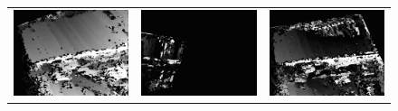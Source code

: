 \documentclass[11pt]{report}
\begin{document}
\begin{figure}[H]
\begin{tabular}{ccc}
    \includegraphics[scale=0.1]{images/disparity-opencv-t/disparity_2.png} &
    \includegraphics[scale=0.1]{images/disparity-opencv-d/disparity_2.png} &
    \includegraphics[scale=0.1]{images/disparity-opengv/disparity_2.png} \\

\end{tabular}
\end{figure}
\end{document}
